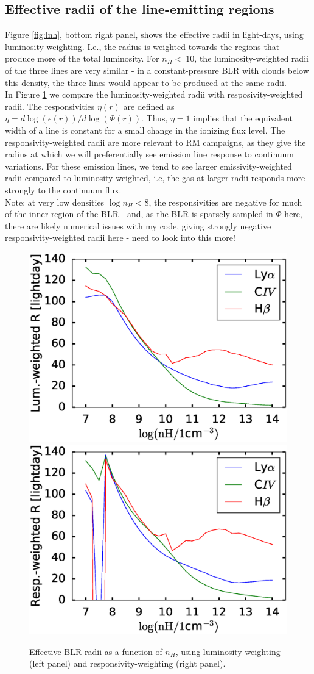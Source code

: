 \documentclass[paper=a4, fontsize=11pt]{scrartcl} %
\numberwithin{equation}{section} %
\numberwithin{figure}{section} %
\numberwithin{table}{section} %
\begin{document}
\subsection{Effective radii of the line-emitting regions}

Figure \ref{fig:lnh}, bottom right panel, shows the effective radii in light-days, using luminosity-weighting. I.e., the radius is weighted towards the regions that produce more of the total luminosity. For $n_H<~10$, the luminosity-weighted radii of the three lines are very similar - in a constant-pressure BLR with clouds below this density, the three lines would appear to be produced at the same radii.\\

In Figure \ref{fig:em-weghted} we compare the luminosity-weighted radii with resposivity-weighted radii. The responsivities $\eta(r)$ are defined as $\eta=d\log(\epsilon(r))/d\log(\Phi(r))$. Thus, $\eta=1$ implies that the equivalent width of a line is constant for a small change in the ionizing flux level. The responsivity-weighted radii are more relevant to RM campaigns, as they give the radius at which we will preferentially see emission line response to continuum variations. For these emission lines, we tend to see larger emissivity-weighted radii compared to luminosity-weighted, i.e, the gas at larger radii responds more strongly to the continuum flux.\\ 

Note: at very low densities $\log n_H<8$, the responsivities are negative for much of the inner region of the BLR - and, as the BLR is sparsely sampled in $\Phi$ here, there are likely numerical issues with my code, giving strongly negative responsivity-weighted radii here - need to look into this more!

\begin{figure}
	\centering
	\includegraphics[width=0.49\linewidth]{RL_nH}
	\includegraphics[width=0.49\linewidth]{RR_nH}
	\caption{Effective BLR radii as a function of $n_H$, using luminosity-weighting (left panel) and responsivity-weighting (right panel).}
\label{fig:em-weghted}
\end{figure}
\end{document}
